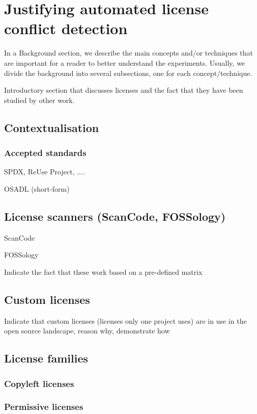 
\chapter{Justifying automated license conflict detection}\label{ch:background}

In a Background section, we describe the main concepts and/or techniques that are important for a reader to better understand the experiments. Usually, we divide the background into several subsections, one for each concept/technique.

Introductory section that discusses licenses and the fact that they have been studied by other work.

\section{Contextualisation}\label{sec:context}


\subsection{Accepted standards}\label{sec:context:standards}

SPDX, ReUse Project, ....

OSADL (short-form)

\section{License scanners (ScanCode, FOSSology)}\label{sec:license-scanners}

ScanCode

FOSSology

Indicate the fact that these work based on a pre-defined matrix

\section{Custom licenses}\label{sec:custom-licenses}

Indicate that custom licenses (licenses only one project uses) are in use in the open source landscape, reason why, demonstrate how

\section{License families}\label{sec:license-families}

\subsection{Copyleft licenses}

\subsection{Permissive licenses}
